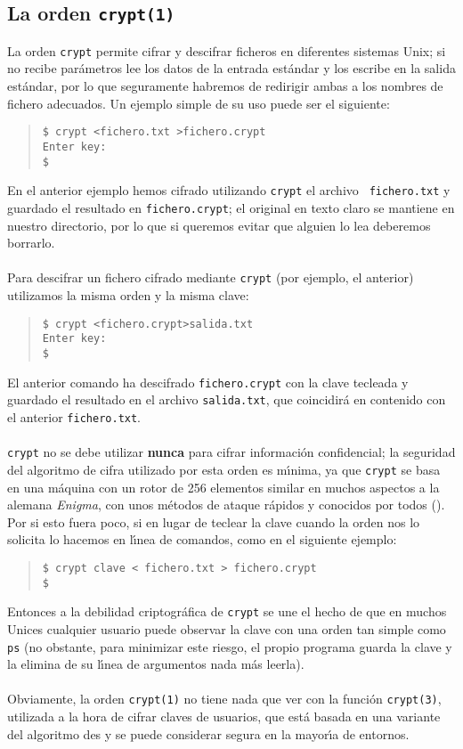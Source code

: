 \subsection{La orden {\tt crypt(1)}}
La orden {\tt crypt} permite cifrar y descifrar ficheros en diferentes sistemas 
Unix; si no recibe pa\-r\'a\-me\-tros lee los datos de la entrada est\'andar y los 
escribe en la salida est\'andar, por lo que seguramente habremos de redirigir 
ambas a los nombres de fichero adecuados. Un ejemplo simple de su uso puede ser 
el siguiente:
\tt
\begin{quote}
\begin{verbatim}
$ crypt <fichero.txt >fichero.crypt
Enter key:
$ 
\end{verbatim}
\end{quote}
\rm
En el anterior ejemplo hemos cifrado utilizando {\tt crypt} el archivo {\tt
fichero.txt} y guardado el resultado en {\tt fichero.crypt}; el original en
texto claro se mantiene en nuestro directorio, por lo que si queremos evitar 
que alguien lo lea deberemos borrarlo.\\
\\Para descifrar un fichero cifrado mediante {\tt crypt} (por ejemplo, el
anterior) utilizamos la misma orden y la misma clave:
\tt
\begin{quote}
\begin{verbatim}
$ crypt <fichero.crypt>salida.txt
Enter key:
$ 
\end{verbatim}
\end{quote}
\rm
El anterior comando ha descifrado {\tt fichero.crypt} con la clave tecleada y
guardado el resultado en el archivo {\tt salida.txt}, que coincidir\'a en 
contenido con el anterior {\tt fichero.txt}.\\ 
\\{\tt crypt} no se debe utilizar {\bf nunca} para cifrar informaci\'on 
confidencial; la seguridad del algoritmo de cifra utilizado por esta orden es
m\'{\i}nima, ya que {\tt crypt} se basa en una m\'aquina con un rotor de 256
elementos similar en muchos aspectos a la alemana {\it Enigma}, con unos 
m\'etodos de ataque r\'apidos y conocidos por todos (\cite{kn:ree84}). Por si
esto fuera poco, si en lugar de teclear la clave cuando la orden nos lo solicita
lo hacemos en l\'{\i}nea de comandos, como en el siguiente ejemplo: 
\tt
\begin{quote}
\begin{verbatim}
$ crypt clave < fichero.txt > fichero.crypt
$ 
\end{verbatim}
\end{quote}
\rm
Entonces a la debilidad criptogr\'afica de {\tt crypt} se une el hecho de que
en muchos Unices cualquier usuario puede observar la clave con una orden tan 
simple como {\tt ps} (no obstante, para minimizar este riesgo, el propio 
programa guarda la clave y la elimina de su l\'{\i}nea de argumentos nada m\'as 
leerla).\\
\\Obviamente, la orden {\tt crypt(1)} no tiene nada que ver con la funci\'on 
{\tt crypt(3)}, utilizada a la hora de cifrar claves de usuarios, que est\'a 
basada en una variante del algoritmo {\sc des} y se puede considerar segura en
la mayor\'{\i}a de entornos.
